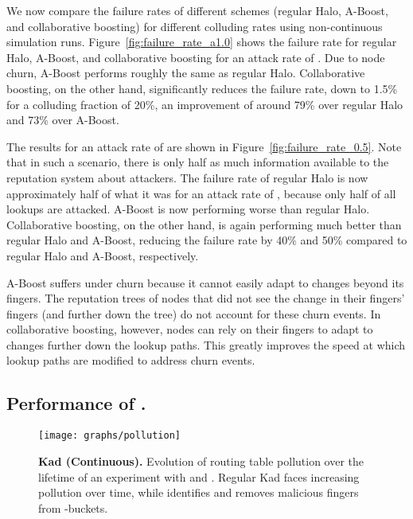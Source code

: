 We now compare the failure rates of different schemes (regular Halo,
A-Boost, and collaborative boosting) for different colluding rates using
non-continuous simulation runs. Figure~\ref{fig:failure_rate_a1.0} shows
the failure rate for regular Halo, A-Boost, and collaborative boosting
for an attack rate of . Due to node churn, A-Boost performs
roughly the same as regular Halo.
Collaborative boosting, on the other hand, significantly reduces the
failure rate, down to 1.5\% for a colluding fraction of 20\%, an
improvement of around 79\% over regular Halo and 73\% over A-Boost.


The results for an attack rate of  are shown in
Figure~\ref{fig:failure_rate_0.5}. Note that in such a scenario, there
is only half as much information available to the reputation system
about attackers. The failure rate of regular Halo is now approximately
half of what it was for an attack rate of , because only half of
all lookups are attacked. A-Boost is now performing worse than regular
Halo. Collaborative boosting, on the other hand, is again performing
much better than regular Halo and A-Boost, reducing the failure rate by
40\% and 50\% compared to regular Halo and A-Boost, respectively.






A-Boost suffers under churn because it cannot easily adapt to changes
beyond its fingers. The reputation trees of nodes that did not see the
change in their fingers' fingers (and further down the tree) do not
account for these churn events.
In collaborative boosting, however, nodes can rely on their fingers to
adapt to changes further down the lookup paths. This greatly improves
the speed at which lookup paths are modified to address churn events.



\subsection{Performance of \ksys.}
\label{sec:eval-kad-perf}


\begin{figure}[t]
 \centering 
  \texttt{[image: graphs/pollution]} 
\caption{{\bf Kad (Continuous).} Evolution of routing table pollution
  over the lifetime of an experiment with  and . Regular
  Kad faces increasing pollution over time, while \ksys identifies and
  removes malicious fingers from -buckets.}
\label{fig:kad_pollution}
\end{figure}


